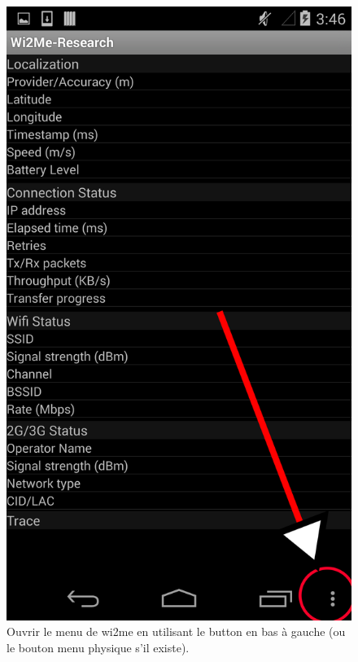 \documentclass[11pt]{article}
\newcommand\mtext[2]{#1}
\newcommand\mtext[2]{#2}
\begin{document}
\begin{figure}
  \centering
  \caption{ \mtext{Ouvrir le menu de wi2me en utilisant le button en bas à gauche (ou le bouton menu physique s'il existe).}{Open the application menu by using the menu button in the bottom left (or your phone's physical menu button if it exists).}}
  \includegraphics[height=0.4\textheight]{MenuStart.png}
\end{figure}
\end{document}

